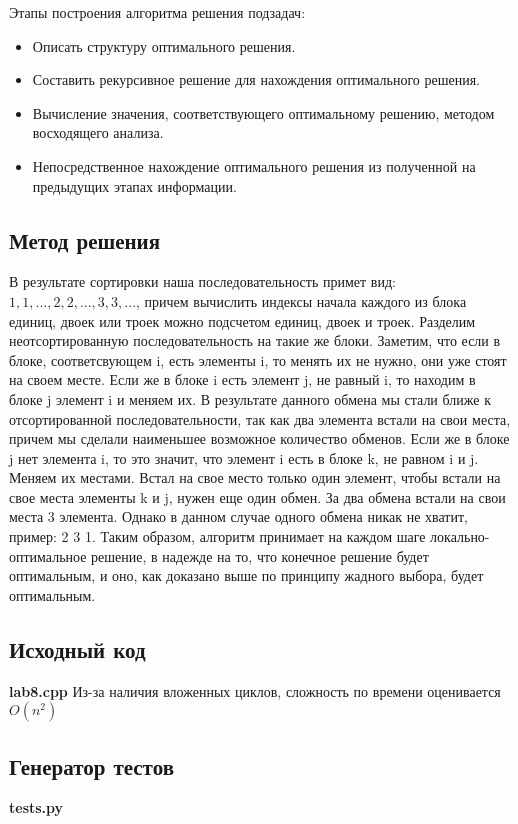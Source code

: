 \documentclass[12pt]{article}
\newcommand{\print}[1]{{\large \textbf{#1}} 
{\scriptsize }}
\begin{document}
\noindent Этапы построения алгоритма решения подзадач:
\begin{itemize}
	\item Описать структуру оптимального решения.
	\item Составить рекурсивное решение для нахождения оптимального решения.
	\item Вычисление значения, соответствующего оптимальному решению, методом
	      восходящего анализа.
	\item Непосредственное нахождение оптимального решения из полученной на предыдущих
	      этапах информации.
\end{itemize}

\subsection*{Метод решения}
В результате сортировки наша последовательность примет вид: $1, 1, ..., 2, 2, ..., 3, 3, ...$, причем вычислить индексы начала каждого из блока единиц, двоек или троек можно подсчетом единиц, двоек и троек. Разделим неотсортированную последовательность на такие же блоки. Заметим, что если в блоке, соответсвующем i, есть элементы i, то менять их не нужно, они уже стоят на своем месте. Если же в блоке i есть элемент j, не равный i, то находим в блоке j элемент i и меняем их. В результате данного обмена мы стали ближе к отсортированной последовательности, так как два элемента встали на свои места, причем мы сделали наименьшее возможное количество обменов. Если же в блоке j нет элемента i, то это значит, что элемент i есть в блоке k, не равном i и j. Меняем их местами. Встал на свое место только один элемент, чтобы встали на свое места элементы k и j, нужен еще один обмен. За два обмена встали на свои места 3 элемента. Однако в данном случае одного обмена никак не хватит, пример: 2 3 1. Таким образом, алгоритм принимает на каждом шаге локально-оптимальное решение, в надежде на то, что конечное решение будет оптимальным, и оно, как доказано выше по принципу жадного выбора, будет оптимальным.

\subsection*{Исходный код}
\print{lab8.cpp}
Из-за наличия вложенных циклов, сложность по времени оценивается $O(n^2)$
\subsection*{Генератор тестов}
\print{tests.py}
\end{document}
